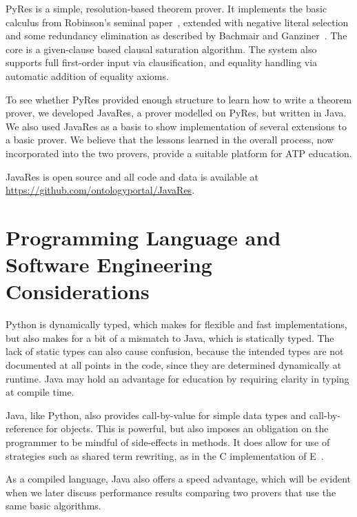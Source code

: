 \documentclass{llncs}
\begin{document}
PyRes is a simple, resolution-based theorem prover. It implements the
basic calculus from Robinson's seminal paper~\cite{Ro65}, extended
with negative literal selection and some redundancy elimination as
described by Bachmair and Ganziner~\cite{BG:HBAR-2001}. The core is a
given-clause based clausal saturation algorithm. The system also
supports full first-order input via clausification, and equality
handling via automatic addition of equality axioms.

To see whether PyRes provided enough structure to learn how to write a
theorem prover, we developed JavaRes, a prover modelled on PyRes, but
written in Java. We also used JavaRes as a basis to show implementation of several
extensions to a basic prover.  We believe that the lessons learned in the overall
process, now incorporated into the two provers, provide a suitable
platform for ATP education.

JavaRes is open source and all code and data is available at
\url{https://github.com/ontologyportal/JavaRes}.




\section{Programming Language and Software Engineering Considerations}

Python is dynamically typed, which makes for flexible and fast
implementations, but also makes for a bit of a mismatch to Java, which
is statically typed.  The lack of static types can also cause
confusion, because the intended types are not documented at all points
in the code, since they are determined dynamically at runtime.  Java
may hold an advantage for education by requiring clarity in typing at
compile time.

Java, like Python, also provides call-by-value for simple data types
and call-by-reference for objects.  This is powerful, but also imposes
an obligation on the programmer to be mindful of side-effects in
methods.  It does allow for use of strategies such as shared term
rewriting, as in the C implementation of E~\cite{LS:LPAR-WS-2001}.

As a compiled language, Java also offers a speed advantage, which will
be evident when we later discuss performance results comparing two
provers that use the same basic algorithms.
\end{document}
